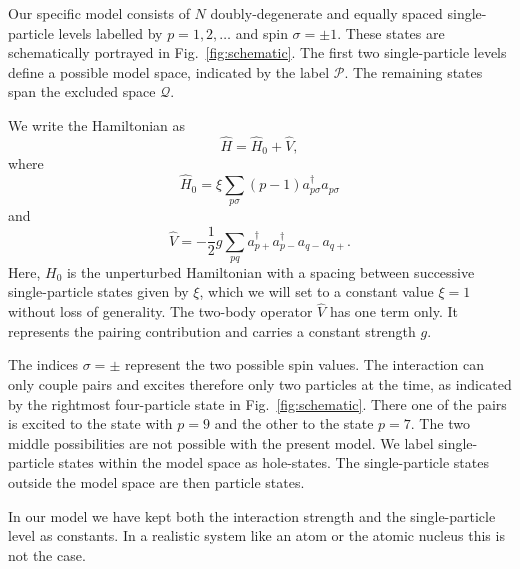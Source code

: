 \documentclass[prc]{revtex4} \usepackage[dvips]{graphicx}
\begin{document}
Our specific model consists of $N$ doubly-degenerate and equally
spaced single-particle levels labelled by $p=1,2,\dots$ and spin
$\sigma=\pm 1$.  These states are schematically portrayed in
Fig.~\ref{fig:schematic}.  The first two single-particle levels define
a possible model space, indicated by the label $\mathcal{P}$.  The
remaining states span the excluded space $\mathcal{Q}$.

We write the Hamiltonian as
\[ \hat{H} = \hat{H}_0 + \hat{V} , \]
where
\[
\hat{H}_0=\xi\sum_{p\sigma}(p-1)a_{p\sigma}^{\dagger}a_{p\sigma}
\]
and
\[
\hat{V}=-\frac{1}{2}g\sum_{pq}a^{\dagger}_{p+}
a^{\dagger}_{p-}a_{q-}a_{q+}.
\]
Here, $H_0$ is the unperturbed Hamiltonian with a spacing between
successive single-particle states given by $\xi$, which we will set to
a constant value $\xi=1$ without loss of generality. The two-body
operator $\hat{V}$ has one term only. It represents the pairing
contribution and carries a constant strength $g$.

The indices
$\sigma=\pm$ represent the two possible spin values. The interaction
can only couple pairs and excites therefore only two particles at the
time, as indicated by the rightmost four-particle state in
Fig.~\ref{fig:schematic}. There one of the pairs is excited to the
state with $p=9$ and the other to the state $p=7$. The two middle
possibilities are not possible with the present model.  We label
single-particle states within the model space as hole-states. The
single-particle states outside the model space are then particle
states. 

In our model we have kept both the interaction strength and the
single-particle level as constants.  In a realistic system like an
atom or the atomic nucleus this is not the case.
\end{document}
